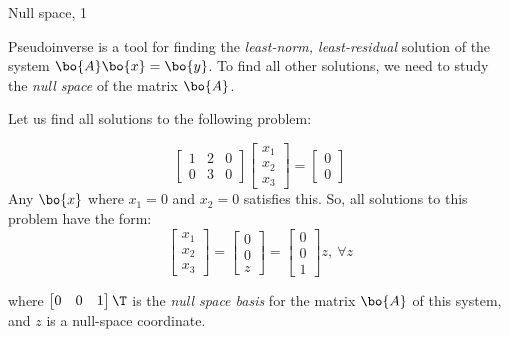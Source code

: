 \documentclass{beamer}
\begin{document}
\begin{frame}{Null space, 1}
	\begin{flushleft}
		
		Pseudoinverse is a tool for finding the \emph{least-norm, least-residual} solution of the system $\bo{A}\bo{x} = \bo{y}$. To find all other solutions, we need to study the \emph{null space} of the matrix $\bo{A}$.
		
		\bigskip
		
		Let us find all solutions to the following problem:
		
		\begin{equation}
			\begin{bmatrix}
				1 & 2 & 0 \\ 0 & 3 & 0
			\end{bmatrix}
			\begin{bmatrix}
			x_1 \\ x_2 \\ x_3
			\end{bmatrix}
			=
			\begin{bmatrix}
				0 \\ 0
			\end{bmatrix}
		\end{equation}
		Any $\bo{x}$ where $x_1 = 0$ and $x_2 = 0$ satisfies this. So, all solutions to this problem have the form:
		\begin{equation}
			\begin{bmatrix}
				x_1 \\ x_2 \\ x_3
			\end{bmatrix}
			=
				\begin{bmatrix}
					0 \\ 0 \\ z
				\end{bmatrix}
				=
				\begin{bmatrix}
					0 \\ 0 \\ 1
				\end{bmatrix}
				z, \ \forall z
		\end{equation}
		
		 where $\begin{bmatrix}
		 	0 & 0 & 1
		 \end{bmatrix}\T$ is the \emph{null space basis} for the matrix $\bo{A}$ of this system, and $z$ is a null-space coordinate.
		
	\end{flushleft}
\end{frame}
\end{document}
